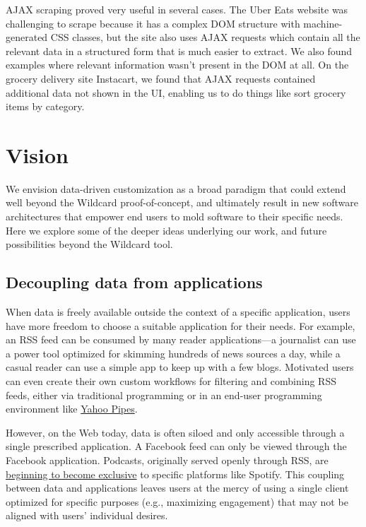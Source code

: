 \documentclass[sigplan,screen,10pt,anonymous,review]{acmart}
\begin{document}
AJAX scraping proved very useful in several cases. The Uber Eats website
was challenging to scrape because it has a complex DOM structure with
machine-generated CSS classes, but the site also uses AJAX requests
which contain all the relevant data in a structured form that is much
easier to extract. We also found examples where relevant information
wasn't present in the DOM at all. On the grocery delivery site
Instacart, we found that AJAX requests contained additional data not
shown in the UI, enabling us to do things like sort grocery items by
category.

\hypertarget{sec:visions}{%
\section{Vision}\label{sec:visions}}

We envision data-driven customization as a broad paradigm that could
extend well beyond the Wildcard proof-of-concept, and ultimately result
in new software architectures that empower end users to mold software to
their specific needs. Here we explore some of the deeper ideas
underlying our work, and future possibilities beyond the Wildcard tool.

\hypertarget{decoupling-data-from-applications}{%
\subsection{Decoupling data from
applications}\label{decoupling-data-from-applications}}

When data is freely available outside the context of a specific
application, users have more freedom to choose a suitable application
for their needs. For example, an RSS feed can be consumed by many reader
applications---a journalist can use a power tool optimized for skimming
hundreds of news sources a day, while a casual reader can use a simple
app to keep up with a few blogs. Motivated users can even create their
own custom workflows for filtering and combining RSS feeds, either via
traditional programming or in an end-user programming environment like
\href{https://en.wikipedia.org/wiki/Yahoo!_Pipes}{Yahoo Pipes}.

However, on the Web today, data is often siloed and only accessible
through a single prescribed application. A Facebook feed can only be
viewed through the Facebook application. Podcasts, originally served
openly through RSS, are
\href{https://stratechery.com/2019/spotifys-podcast-aggregation-play/}{beginning
to become exclusive} to specific platforms like Spotify. This coupling
between data and applications leaves users at the mercy of using a
single client optimized for specific purposes (e.g., maximizing
engagement) that may not be aligned with users' individual desires.
\end{document}

